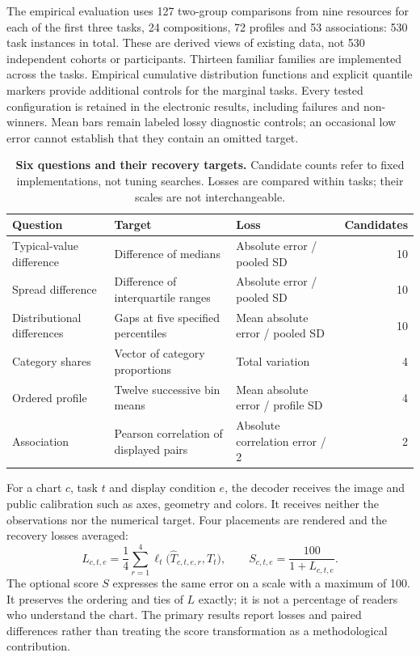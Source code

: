 \documentclass[11pt]{article}
\begin{document}
The empirical evaluation uses 127 two-group comparisons from nine resources for each of the first three tasks, 24 compositions, 72 profiles and 53 associations: 530 task instances in total. These are derived views of existing data, not 530 independent cohorts or participants. Thirteen familiar families are implemented across the tasks. Empirical cumulative distribution functions and explicit quantile markers provide additional controls for the marginal tasks. Every tested configuration is retained in the electronic results, including failures and non-winners. Mean bars remain labeled lossy diagnostic controls; an occasional low error cannot establish that they contain an omitted target.

\begin{table}[ht]\centering\small
\caption{\textbf{Six questions and their recovery targets.} Candidate counts refer to fixed implementations, not tuning searches. Losses are compared within tasks; their scales are not interchangeable.}\label{tab:tasks}
\begin{tabularx}{\linewidth}{p{2.6cm}X p{4.1cm}r}\toprule
Question & Target & Loss & Candidates\\\midrule
Typical-value difference & Difference of medians & Absolute error / pooled SD & 10\\
Spread difference & Difference of interquartile ranges & Absolute error / pooled SD & 10\\
Distributional differences & Gaps at five specified percentiles & Mean absolute error / pooled SD & 10\\
Category shares & Vector of category proportions & Total variation & 4\\
Ordered profile & Twelve successive bin means & Mean absolute error / profile SD & 4\\
Association & Pearson correlation of displayed pairs & Absolute correlation error / 2 & 2\\\bottomrule
\end{tabularx}
\end{table}

For a chart $c$, task $t$ and display condition $e$, the decoder receives the image and public calibration such as axes, geometry and colors. It receives neither the observations nor the numerical target. Four placements are rendered and the recovery losses averaged:
\begin{equation}
 L_{c,t,e}=\frac14\sum_{r=1}^{4}\ell_t\bigl(\widehat T_{c,t,e,r},T_t\bigr),
 \qquad S_{c,t,e}=\frac{100}{1+L_{c,t,e}}.
\end{equation}
The optional score $S$ expresses the same error on a scale with a maximum of 100. It preserves the ordering and ties of $L$ exactly; it is not a percentage of readers who understand the chart. The primary results report losses and paired differences rather than treating the score transformation as a methodological contribution.
\end{document}
